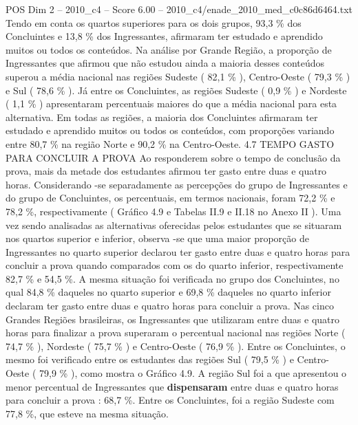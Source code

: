 \begin{textsample}{POS Dim 2 – 2010\_c4 – Score 6.00 – 2010\_c4/enade\_2010\_med\_c0c86d6464.txt}
Tendo em conta os quartos superiores para os dois grupos, 93,3 \% dos Concluintes e 13,8 \% dos Ingressantes, afirmaram ter estudado e aprendido muitos ou todos os conteúdos.
Na análise por Grande Região, a proporção de Ingressantes que afirmou que não estudou ainda a maioria desses conteúdos superou a média nacional nas regiões Sudeste ( 82,1 \% ), Centro-Oeste ( 79,3 \% ) e Sul ( 78,6 \% ).
Já entre os Concluintes, as regiões Sudeste ( 0,9 \% ) e Nordeste ( 1,1 \% ) apresentaram percentuais maiores do que a média nacional para esta alternativa.
Em todas as regiões, a maioria dos Concluintes afirmaram ter estudado e aprendido muitos ou todos os conteúdos, com proporções variando entre 80,7 \% na região Norte e 90,2 \% na Centro-Oeste. 4.7 TEMPO GASTO PARA CONCLUIR A PROVA Ao responderem sobre o tempo de conclusão da prova, mais da metade dos estudantes afirmou ter gasto entre duas e quatro horas.
Considerando -se separadamente as percepções do grupo de Ingressantes e do grupo de Concluintes, os percentuais, em termos nacionais, foram 72,2 \% e 78,2 \%, respectivamente ( Gráfico 4.9 e Tabelas II.9 e II.18 no Anexo II ).
Uma vez sendo analisadas as alternativas oferecidas pelos estudantes que se situaram nos quartos superior e inferior, observa -se que uma maior proporção de Ingressantes no quarto superior declarou ter gasto entre duas e quatro horas para concluir a prova quando comparados com os do quarto inferior, respectivamente 82,7 \% e 54,5 \%.
A mesma situação foi verificada no grupo dos Concluintes, no qual 84,8 \% daqueles no quarto superior e 69,8 \% daqueles no quarto inferior declaram ter gasto entre duas e quatro horas para concluir a prova.
Nas cinco Grandes Regiões brasileiras, os Ingressantes que utilizaram entre duas e quatro horas para finalizar a prova superaram o percentual nacional nas regiões Norte ( 74,7 \% ), Nordeste ( 75,7 \% ) e Centro-Oeste ( 76,9 \% ).
Entre os Concluintes, o mesmo foi verificado entre os estudantes das regiões Sul ( 79,5 \% ) e Centro-Oeste ( 79,9 \% ), como mostra o Gráfico 4.9.
A região Sul foi a que apresentou o menor percentual de Ingressantes que \textbf{dispensaram} entre duas e quatro horas para concluir a prova : 68,7 \%.
Entre os Concluintes, foi a região Sudeste com 77,8 \%, que esteve na mesma situação.

\end{textsample}
